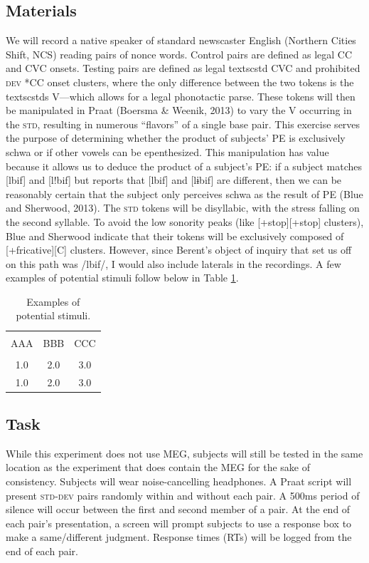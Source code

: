 \documentclass[jou,apacite]{apa6}
\begin{document}
    \subsection{Materials}
    We will record a native speaker of standard newscaster English (Northern Cities Shift, NCS) reading pairs of nonce words. Control pairs are defined as legal CC and CVC onsets. Testing pairs are defined as legal textsc{std} CVC and prohibited \textsc{dev} *CC onset clusters, where the only difference between the two tokens is the textsc{std}s V—which allows for a legal phonotactic parse. These tokens will then be manipulated in Praat (Boersma & Weenik, 2013) to vary the V occurring in the \textsc{std}, resulting in numerous “flavors” of a single base pair. This exercise serves the purpose of determining whether the product of subjects’ PE is exclusively schwa or if other vowels can be epenthesized. This manipulation has value because it allows us to deduce the product of a subject’s PE: if a subject matches [lbif] and [l!bif] but reports that [lbif] and [lɨbif] are different, then we can be reasonably certain that the subject only perceives schwa as the result of PE (Blue and Sherwood, 2013). The \textsc{std} tokens will be disyllabic, with the stress falling on the second syllable. To avoid the low sonority peaks (like [+stop][+stop] clusters), Blue and Sherwood indicate that their tokens will be exclusively composed of [+fricative][C] clusters. However, since Berent’s object of inquiry that set us off on this path was /lbif/, I would also include laterals in the recordings. A few examples of potential stimuli follow below in Table \ref{tab1}.
    
        
        \begin{table}[!htb]
        \caption{Examples of potential stimuli.}\label{tab1}
        \begin{tabular}{ccc}
        \hline\\[-1.5ex]
        AAA & BBB & CCC \\[0.5ex]
        \hline\\[-1.5ex]
        1.0 & 2.0 & 3.0\\[0.5ex]
        1.0 & 2.0 & 3.0\\[0.5ex]
        \hline
        \end{tabular}
        \end{table}
        
    \subsection{Task}
    While this experiment does not use MEG, subjects will still be tested in the same location as the experiment that does contain the MEG for the sake of consistency. Subjects will wear noise-cancelling headphones. A Praat script will present \textsc{std-dev} pairs randomly within and without each pair. A 500ms period of silence will occur between the first and second member of a pair. At the end of each pair’s presentation, a screen will prompt subjects to use a response box to make a same/different judgment. Response times (RTs) will be logged from the end of each pair.
    
\end{document}
